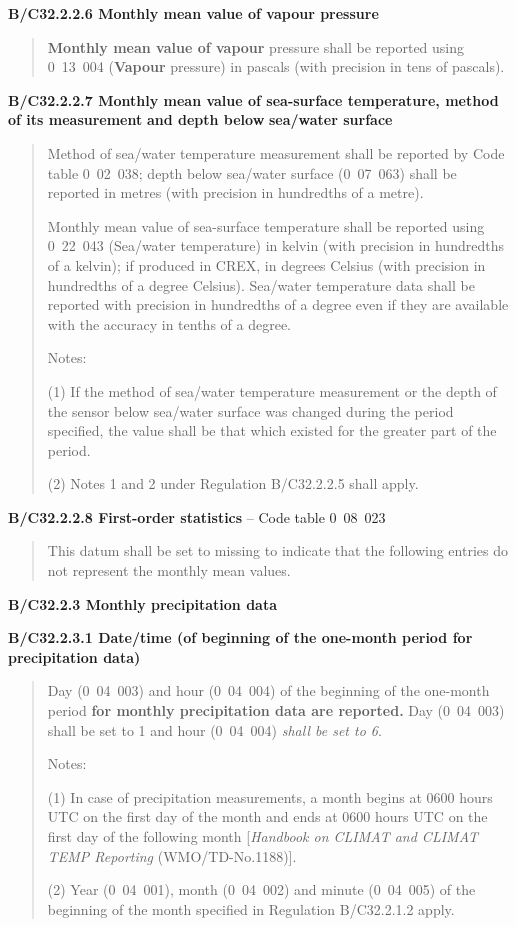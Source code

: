 \textbf{B/C32.2.2.6 Monthly mean value of vapour pressure}

\begin{quote}
\textbf{Monthly mean value of vapour} pressure shall be reported using 0~13~004 (\textbf{Vapour} pressure) in pascals (with precision in tens of pascals).
\end{quote}

\textbf{B/C32.2.2.7 Monthly mean value of sea-surface temperature, method of its measurement} \textbf{and depth below} \textbf{sea/water surface}

\begin{quote}
Method of sea/water temperature measurement shall be reported by Code table 0~02~038; depth below sea/water surface (0~07~063) shall be reported in metres (with precision in hundredths of a metre).

Monthly mean value of sea-surface temperature shall be reported using 0~22~043 (Sea/water temperature) in kelvin (with precision in hundredths of a kelvin); if produced in CREX, in degrees Celsius (with precision in hundredths of a degree Celsius). Sea/water temperature data shall be reported with precision in hundredths of a degree even if they are available with the accuracy in tenths of a degree.

Notes:

(1) If the method of sea/water temperature measurement or the depth of the sensor below sea/water surface was changed during the period specified, the value shall be that which existed for the greater part of the period.

(2) Notes 1 and 2 under Regulation B/C32.2.2.5 shall apply.
\end{quote}

\textbf{B/C32.2.2.8 First-order statistics} -- Code table 0~08~023

\begin{quote}
This datum shall be set to missing to indicate that the following entries do not represent the monthly mean values.
\end{quote}

\textbf{B/C32.2.3 Monthly precipitation data}

\textbf{B/C32.2.3.1 Date/time (of beginning of the one-month period for precipitation data)}

\begin{quote}
Day (0~04~003) and hour (0~04~004) of the beginning of the one-month period \textbf{for monthly precipitation data are reported.} Day (0~04~003) shall be set to 1 and hour (0~04~004) \emph{shall be set to 6}.

Notes:

(1) In case of precipitation measurements, a month begins at 0600 hours UTC on the first day of the month and ends at 0600 hours UTC on the first day of the following month {[}\emph{Handbook on CLIMAT and CLIMAT TEMP Reporting} (WMO/TD-No.1188){]}.

(2) Year (0~04~001), month (0~04~002) and minute (0~04~005) of the beginning of the month specified in Regulation B/C32.2.1.2 apply.
\end{quote}

